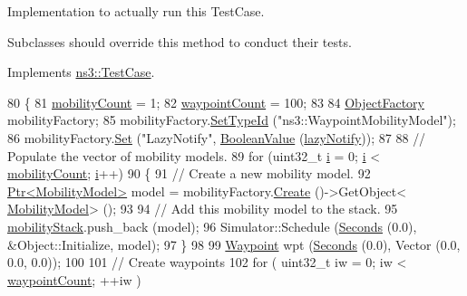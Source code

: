 Implementation to actually run this Test\+Case. 

Subclasses should override this method to conduct their tests. 

Implements \hyperlink{classns3_1_1TestCase_a8ff74680cf017ed42011e4be51917a24}{ns3\+::\+Test\+Case}.


\begin{DoxyCode}
80 \{
81   \hyperlink{classWaypointMobilityModelNotifyTest_aadb1d796ea62f4f7255539bec44cb6ef}{mobilityCount} = 1;
82   \hyperlink{classWaypointMobilityModelNotifyTest_a54c74c8def841c5a4376550ec36b73c5}{waypointCount} = 100;
83 
84   \hyperlink{classns3_1_1ObjectFactory}{ObjectFactory} mobilityFactory;
85   mobilityFactory.\hyperlink{classns3_1_1ObjectFactory_a77dcd099064038a1eb7a6b8251229ec3}{SetTypeId} (\textcolor{stringliteral}{"ns3::WaypointMobilityModel"});
86   mobilityFactory.\hyperlink{classns3_1_1ObjectFactory_aef5c0d5019c96bdf01cefd1ff83f4a68}{Set} (\textcolor{stringliteral}{"LazyNotify"}, \hyperlink{classns3_1_1BooleanValue}{BooleanValue} (\hyperlink{classWaypointMobilityModelNotifyTest_ac3f904848852654223a7a823a0c73107}{lazyNotify}));
87 
88   \textcolor{comment}{// Populate the vector of mobility models.}
89   \textcolor{keywordflow}{for} (uint32\_t \hyperlink{bernuolliDistribution_8m_a6f6ccfcf58b31cb6412107d9d5281426}{i} = 0; \hyperlink{bernuolliDistribution_8m_a6f6ccfcf58b31cb6412107d9d5281426}{i} < \hyperlink{classWaypointMobilityModelNotifyTest_aadb1d796ea62f4f7255539bec44cb6ef}{mobilityCount}; \hyperlink{bernuolliDistribution_8m_a6f6ccfcf58b31cb6412107d9d5281426}{i}++)
90     \{
91       \textcolor{comment}{// Create a new mobility model.}
92       \hyperlink{classns3_1_1Ptr}{Ptr<MobilityModel>} model = mobilityFactory.\hyperlink{classns3_1_1ObjectFactory_a18152e93f0a6fe184ed7300cb31e9896}{Create} ()->GetObject<
      \hyperlink{classns3_1_1MobilityModel}{MobilityModel}> ();
93 
94       \textcolor{comment}{// Add this mobility model to the stack.}
95       \hyperlink{classWaypointMobilityModelNotifyTest_a7e6de57e6fbec72887e4cc25c7e561d3}{mobilityStack}.push\_back (model);
96       Simulator::Schedule (\hyperlink{group__timecivil_ga33c34b816f8ff6628e33d5c8e9713b9e}{Seconds} (0.0), &Object::Initialize, model);
97     \} 
98 
99   \hyperlink{classns3_1_1Waypoint}{Waypoint} wpt (\hyperlink{group__timecivil_ga33c34b816f8ff6628e33d5c8e9713b9e}{Seconds} (0.0), Vector (0.0, 0.0, 0.0));
100 
101   \textcolor{comment}{// Create waypoints}
102   \textcolor{keywordflow}{for} ( uint32\_t iw = 0; iw < \hyperlink{classWaypointMobilityModelNotifyTest_a54c74c8def841c5a4376550ec36b73c5}{waypointCount}; ++iw )

\end{DoxyCode}
